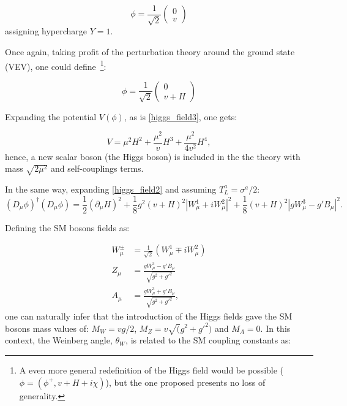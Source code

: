 \begin{equation}
    \phi = \frac{1}{\sqrt{2}}
        \left ( 
        \begin{matrix}
        0 \\
        v 
        \end{matrix}
        \right )
    \label{higgs_field_vev_based}
\end{equation}
assigning hypercharge $Y=1$.

Once again, taking profit of the perturbation theory around the ground state (VEV), one could define~\footnote{A even more general redefinition of the Higgs field would be possible ($\phi = (\phi^+, v + H +i \chi)$), but the one proposed presents no loss of generality.}:

\begin{equation}
    \phi = \frac{1}{\sqrt{2}}
        \left ( 
        \begin{matrix}
        0 \\
        v + H
        \end{matrix}
        \right )
    \label{higgs_field_vev_based}
\end{equation}

Expanding the potential $V(\phi)$, as is \ref{higgs_field3}, one gets:

\begin{equation}
    V = \mu^2 H^2 + \frac{\mu^2}{v} H^3 + \frac{\mu^2}{4v^2} H^4,
    \label{higgs_mass_term}
\end{equation}
hence, a new scalar boson (the Higgs boson) is included in the the theory with mass $\sqrt{2\mu^2}$ and self-couplings terms.

In the same way, expanding \ref{higgs_field2} and assuming $T_L^a = \sigma^a/2$: 
\begin{equation}
    (D_\mu\phi)^\dagger(D_\mu\phi) = \frac{1}{2}(\partial_\mu H)^2 + \frac{1}{8}g^2(v+H)^2|W_\mu^1+iW_\mu^2|^2 + \frac{1}{8}(v+H)^2|gW_\mu^3-g'B_\mu|^2.
    \label{higgs_mass_term}
\end{equation}

Defining the SM bosons fields as:

\begin{equation}
    \begin{split}
        W_\mu^\pm &= \frac{1}{\sqrt{2}} (W_\mu^1 \mp iW_\mu^2) \\ 
        Z_\mu &= \frac{gW_\mu^3-g'B_\mu}{\sqrt{g^2+g'^2}} \\ 
        A_\mu &= \frac{gW_\mu^3+g'B_\mu}{\sqrt{g^2+g'^2}},
    \end{split}
    \label{sm_bosons_fields}
\end{equation}
one can naturally infer that the introduction of the Higgs fields gave the SM bosons mass values of: $M_W = vg/2$, $M_Z = v\sqrt(g^2+g'^2)$ and $M_A = 0$. In this context, the Weinberg angle, $\theta_W$, is related to the SM coupling constants as:

